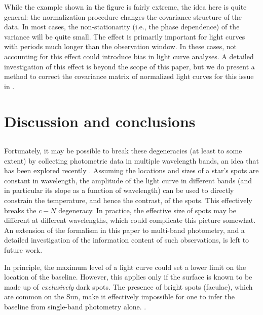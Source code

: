 \documentclass[modern]{aastex62}
\begin{document}
While the example shown in the figure is fairly extreme, the idea here
is quite general: the normalization procedure changes the covariance
structure of the data. In most cases, the non-stationarity (i.e., the
phase dependence) of the variance will be quite small. The effect is primarily
important for light curves with periods much longer than
the observation window. In these cases, not accounting for this effect
could introduce bias in light curve analyses. A detailed investigation of
this effect is beyond the scope of this paper, but we do present a
method to correct the covariance matrix of normalized light curves for
this issue in .

\section{Discussion and conclusions}


\subsection{}

Fortunately, it may be possible to break these degeneracies (at least to some extent)
by collecting photometric data in multiple wavelength bands, an idea that has
been explored recently \citep[e.g.,][]{Gully2017,Guo2018}. Assuming the
locations and sizes of a star's spots are constant in wavelength, the amplitude
of the light curve in different bands (and in particular its slope as a function
of wavelength) can be used to directly constrain the
temperature, and hence the contrast, of the spots. This effectively breaks the
$c-N$ degeneracy. In practice, the effective size of spots may be different
at different wavelengths, which could complicate this picture somewhat. An extension
of the formalism in this paper to multi-band photometry, and a detailed investigation
of the information content of such observations, is left to future work.


%

In principle, the maximum level of a light curve could set a lower limit on
the location of the baseline. However, this applies only if the surface is
known to be made up of \emph{exclusively} dark spots. The presence of bright
spots (faculae), which are common on the Sun, make it effectively impossible
for one to infer the baseline from single-band photometry alone.
\citep{Basri2018}.
\end{document}
